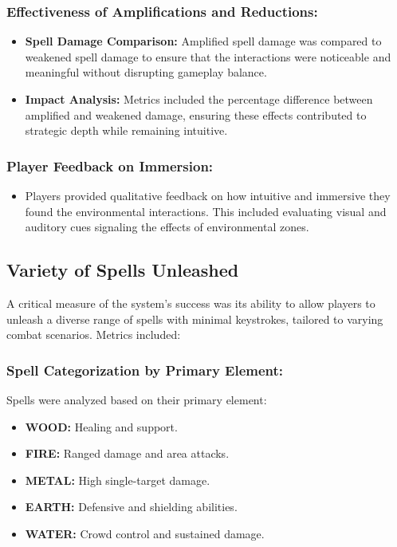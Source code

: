 \documentclass[10pt,twocolumn]{article}
\begin{document}
\subsubsection{Effectiveness of Amplifications and Reductions:}

\begin{itemize}
    \item \textbf{Spell Damage Comparison:} Amplified spell damage was compared to weakened spell damage to ensure that the interactions were noticeable and meaningful without disrupting gameplay balance.
    \item \textbf{Impact Analysis:} Metrics included the percentage difference between amplified and weakened damage, ensuring these effects contributed to strategic depth while remaining intuitive.
\end{itemize}

\subsubsection{Player Feedback on Immersion:}

\begin{itemize}
    \item Players provided qualitative feedback on how intuitive and immersive they found the environmental interactions. This included evaluating visual and auditory cues signaling the effects of environmental zones.
\end{itemize}

\subsection{Variety of Spells Unleashed}
A critical measure of the system’s success was its ability to allow players to unleash a diverse range of spells with minimal keystrokes, tailored to varying combat scenarios. Metrics included:

\subsubsection{Spell Categorization by Primary Element:}
Spells were analyzed based on their primary element:

\begin{itemize}
    \item \textbf{WOOD:} Healing and support.
    \item \textbf{FIRE:} Ranged damage and area attacks.
    \item \textbf{METAL:} High single-target damage.
    \item \textbf{EARTH:} Defensive and shielding abilities.
    \item \textbf{WATER:} Crowd control and sustained damage.
\end{itemize}
\end{document}
